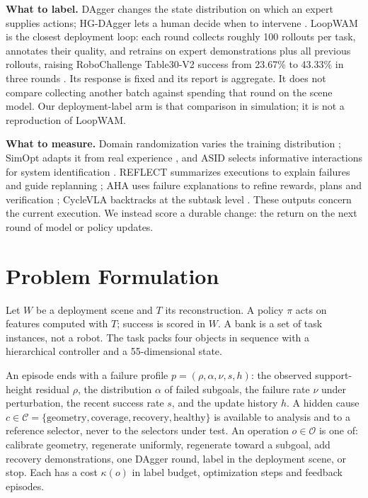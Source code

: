 \documentclass[conference]{IEEEtran}
\begin{document}
\textbf{What to label.} DAgger changes the state distribution on which an expert supplies actions; HG-DAgger lets a human decide when to intervene \cite{ross2011dagger,kelly2019hgdagger}. LoopWAM is the closest deployment loop: each round collects roughly 100 rollouts per task, annotates their quality, and retrains on expert demonstrations plus all previous rollouts, raising RoboChallenge Table30-V2 success from 23.67\% to 43.33\% in three rounds \cite{loopwam}. Its response is fixed and its report is aggregate. It does not compare collecting another batch against spending that round on the scene model. Our deployment-label arm is that comparison in simulation; it is not a reproduction of LoopWAM.

\textbf{What to measure.} Domain randomization varies the training distribution \cite{tobin2017dr}; SimOpt adapts it from real experience \cite{chebotar2019asid}, and ASID selects informative interactions for system identification \cite{asid}. REFLECT summarizes executions to explain failures and guide replanning \cite{reflect}; AHA uses failure explanations to refine rewards, plans and verification \cite{aha}; CycleVLA backtracks at the subtask level \cite{cyclevla}. These outputs concern the current execution. We instead score a durable change: the return on the next round of model or policy updates.

\section{Problem Formulation}
Let $W$ be a deployment scene and $T$ its reconstruction. A policy $\pi$ acts on features computed with $T$; success is scored in $W$. A bank is a set of task instances, not a robot. The task packs four objects in sequence with a hierarchical controller and a 55-dimensional state.

An episode ends with a failure profile $p=(\rho,\alpha,\nu,s,h)$: the observed support-height residual $\rho$, the distribution $\alpha$ of failed subgoals, the failure rate $\nu$ under perturbation, the recent success rate $s$, and the update history $h$. A hidden cause $c\in\mathcal{C}=\{\text{geometry},\text{coverage},\text{recovery},\text{healthy}\}$ is available to analysis and to a reference selector, never to the selectors under test. An operation $o\in\mathcal{O}$ is one of: calibrate geometry, regenerate uniformly, regenerate toward a subgoal, add recovery demonstrations, one DAgger round, label in the deployment scene, or stop. Each has a cost $\kappa(o)$ in label budget, optimization steps and feedback episodes.
\end{document}
